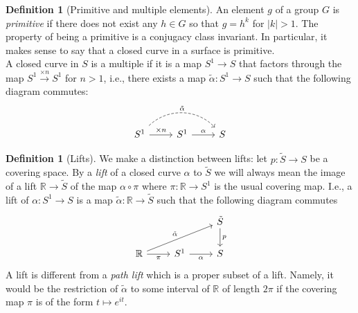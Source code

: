 \documentclass[reqno]{amsart}
\theoremstyle{definition}
\newtheorem{definition}[theorem]{Definition}
\theoremstyle{remark}
\begin{document}
\begin{definition}[Primitive and multiple elements]
    An element $g$ of a group $G$ is \textit{primitive} if there
    does not exist any $h \in G$ so that $g = h^{k}$ for
    $\left| k \right| >1$. The property of being a primitive
    is a conjugacy class invariant. In particular, it makes
    sense to say that a closed curve in a surface is primitive.\\
    A closed curve in $S$ is a multiple if it is a map
    $S^{1} \to S$ that factors through the map
    $S^{1} \stackrel{\times n}{\to } S^{1}$ for
    $n >1$, i.e., there exists a map $\tilde{\alpha} \colon
    S^{1} \to S$ such that the following diagram commutes:
    \begin{equation*}
    \begin{tikzcd}
        S^{1} \ar[r, "\times n"] \ar[rr, bend left = 45, dashed,
        "\tilde{\alpha}"] & S^{1} \ar[r,
        "\alpha"] & S
    \end{tikzcd}
    \end{equation*}
\end{definition}

\begin{definition}[Lifts]
    We make a distinction between lifts: let $p \colon
    \tilde{S} \to S$ be a covering space. By a \textit{lift} of a closed
    curve $\alpha$ to $\tilde{S}$ we will always mean the image of
    a lift $\mathbb{R} \to \tilde{S}$ of the map
    $\alpha \circ \pi$ where $\pi \colon \mathbb{R} \to S^{1}$ is
    the usual covering map. I.e., a lift of $\alpha \colon
    S^{1} \to S$ is a map  $\tilde{\alpha} \colon \mathbb{R} \to 
    \tilde{S}$ such that the following diagram commutes
    \begin{equation*}
    \begin{tikzcd}
        & & \tilde{S} \ar[d, "p"]\\
        \mathbb{R} \ar[r, "\pi"'] \ar[rru, "\tilde{\alpha}"] & S^{1} \ar[r, 
        "\alpha"'] & S
    \end{tikzcd}
    \end{equation*}
    A lift is different from a \textit{path lift} which is
    a proper subset of a lift. Namely, it would be
    the restriction of $\tilde{\alpha}$ to some interval of
    $\mathbb{R}$ of length $2 \pi$ if the covering map
    $\pi$ is of the form $t \mapsto e^{it}$.
\end{definition}
\end{document}
